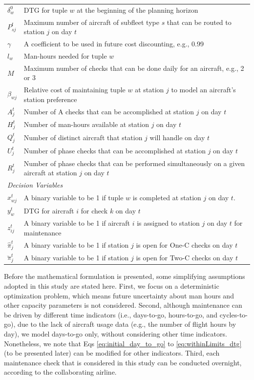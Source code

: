 \begin{longtable}{l p{16cm}}
$\delta_w^0$ & DTG for tuple $w$ at the beginning of the planning horizon \\
$P_{sj}^t$ & Maximum number of aircraft of subfleet type $s$ that can be routed to station $j$ on day $t$ \\
$\gamma$ & A coefficient to be used in future cost discounting, e.g., 0.99  \\
$l_w$ & Man-hours needed for tuple $w$ \\
$M$ & Maximum number of checks that can be done daily for an aircraft, e.g., 2 or 3 \\
$\beta_{wj}$  & Relative cost of maintaining tuple $w$ at station $j$ to model an aircraft's station preference \\
$A_j^t$ & Number of A checks that can be accomplished at station $j$ on day $t$ \\
$H_j^t$ & Number of man-hours available at station $j$ on day $t$ \\
$Q_j^t$ & Number of distinct aircraft that station $j$ will handle on day $t$  \\
$U_j^t$ & Number of phase checks that can be accomplished at station $j$ on day $t$ \\
$R_j^t$ & Number of phase checks that can be performed simultaneously on a given aircraft at station $j$ on day $t$\\

\hline
\multicolumn{2}{l}{\textit{Decision Variables}} \\ \hline
$x_{wj}^t$ & A binary variable to be 1 if tuple $w$ is completed at station $j$ on day $t$. \\
$y_w^t$ & DTG for aircraft $i$ for check $k$ on day $t$ \\ 
$z_{ij}^t$ & A binary variable to be 1 if aircraft $i$ is assigned to station $j$ on day $t$ for maintenance \\
$\hat{\pi}_j^t$ & A binary variable to be 1 if station $j$ is open for One-C checks on day $t$ \\
$\breve{\pi}_j^t$ & A binary variable to be 1 if station $j$ is open for Two-C checks on day $t$ \\
\end{longtable}
\endgroup

Before the mathematical formulation is presented, some simplifying assumptions adopted in this study are stated here. First, we focus on a deterministic optimization problem, which means future uncertainty about man hours and other capacity parameters is not considered. Second, although maintenance can be driven by different time indicators (i.e., days-to-go, hours-to-go, and cycles-to-go), due to the lack of aircraft usage data (e.g., the number of flight hours by day), we model days-to-go only, without considering other time indicators. Nonetheless, we note that Eqs \eqref{eq:initial_day_to_go} to \eqref{eq:withinLimits_dtg} (to be presented later) can be modified for other indicators. Third, each maintenance check that is considered in this study can be conducted overnight, according to the collaborating airline.


